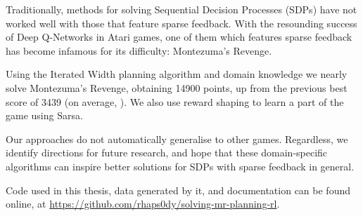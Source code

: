 \newpage
\thispagestyle{empty}
\vfill
{}
Traditionally, methods for solving Sequential Decision Processes (SDPs) have not
worked well with those that feature sparse feedback. With the resounding success
of Deep Q-Networks \citep{mnih2015human} in Atari games, one of them which
features sparse feedback has become infamous for its difficulty: Montezuma's
Revenge.

Using the Iterated Width \citep{lipovetzky2015classical} planning algorithm and
domain knowledge we nearly solve Montezuma's Revenge, obtaining
14900 points, up from the previous best score of 3439 (on average,
\cite{bellemare2016unifying}). We also use reward shaping to learn a part of the
game using Sarsa.

Our approaches do not automatically generalise to other games. Regardless, we
identify directions for future research, and hope that these domain-specific
algorithms can inspire better solutions for SDPs with sparse feedback in
general.

\vspace{2cm}

Code used in this thesis, data generated by it, and documentation can be found
online, at
\href{https://github.com/rhaps0dy/solving-mr-planning-rl}{https://github.com/rhaps0dy/solving-mr-planning-rl}.

\vfill